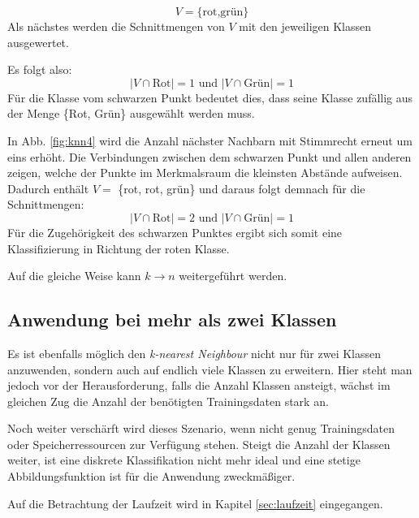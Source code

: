 \documentclass[fontsize=11pt]{scrartcl}
\begin{document}
                $$
                    V=\{\text{rot,grün}\}
                $$ 
                Als nächstes werden die Schnittmengen von $V$ mit den jeweiligen Klassen ausgewertet.\par 
                Es folgt also:
                $$
                    |V \cap \text{Rot}| = 1 \text{ und } | V \cap \text{Grün} | = 1
                $$
                Für die Klasse vom schwarzen Punkt bedeutet dies, dass seine Klasse zufällig aus der Menge \{Rot, Grün\} ausgewählt werden muss.     
                \par
            	In Abb. \ref{fig:knn4} wird die Anzahl nächster Nachbarn mit Stimmrecht erneut um eins erhöht. Die Verbindungen zwischen dem schwarzen Punkt und allen anderen zeigen, welche der Punkte im Merkmalsraum die kleinsten Abstände aufweisen. Dadurch enthält $V=$ \{rot, rot, grün\} und daraus folgt demnach für die Schnittmengen:
                $$
                    |V \cap \text{Rot} | = 2 \text{ und } | V \cap \text{Grün} | = 1
                $$
            	Für die Zugehörigkeit des schwarzen Punktes ergibt sich somit eine Klassifizierung in Richtung der roten Klasse.
            	
            	Auf die gleiche Weise kann $k \rightarrow n$ weitergeführt werden.
                        
            \subsection{Anwendung bei mehr als zwei Klassen}
                Es ist ebenfalls möglich den \emph{k-nearest Neighbour} nicht nur für zwei Klassen anzuwenden, sondern auch auf endlich viele Klassen zu erweitern. Hier steht man jedoch vor der Herausforderung, falls die Anzahl Klassen ansteigt, wächst im gleichen Zug die Anzahl der benötigten Trainingsdaten stark an.\cite{ertel2016_p211}\par
                Noch weiter verschärft wird dieses Szenario, wenn nicht genug Trainingsdaten oder Speicherressourcen zur Verfügung stehen. 
                Steigt die Anzahl der Klassen weiter, ist eine diskrete Klassifikation nicht mehr ideal und eine stetige Abbildungsfunktion ist für die Anwendung zweckmäßiger.\cite{ertel2016_p211}
                \par
                Auf die Betrachtung der Laufzeit wird in Kapitel \ref{sec:laufzeit} eingegangen.
                
\end{document}
